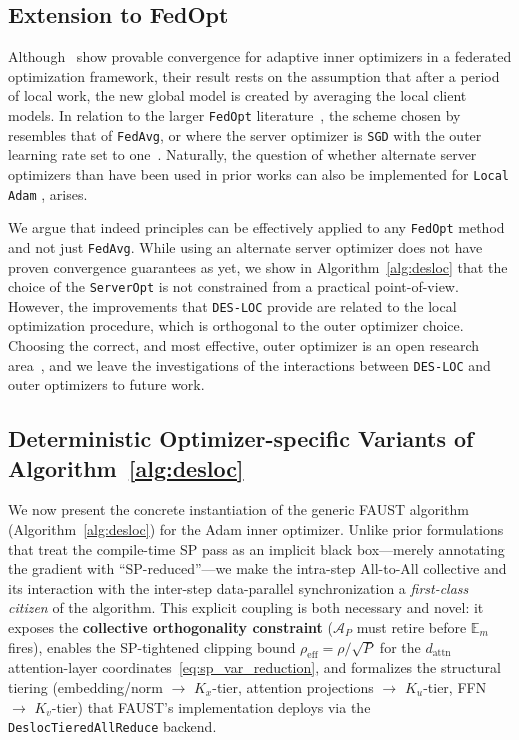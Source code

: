 \documentclass{article}
\begin{document}
\subsection{Extension to FedOpt}
\label{sec:fedopt2}

Although~\citet{cheng2025convergencedistributedadaptiveoptimization} show provable convergence for adaptive inner optimizers in a
federated optimization framework, their result rests on the assumption that after a period of local
work, the new global model is created by averaging the local client models. In relation to the larger
\texttt{FedOpt} literature~\citep{reddi2021adaptivefederatedoptimization}, the scheme chosen by~\citet{cheng2025convergencedistributedadaptiveoptimization} resembles
that of \texttt{FedAvg}, or where the server optimizer is \texttt{SGD} with the outer learning rate set to one~\citep{reddi2021adaptivefederatedoptimization}.
Naturally, the question of whether alternate server optimizers than have been used in prior works
can also be implemented for \texttt{Local Adam} , arises.

We argue that indeed principles can be effectively applied to any \texttt{FedOpt} method and
not just \texttt{FedAvg}. While using an alternate server optimizer does not have proven convergence
guarantees as yet, we show in Algorithm~\ref{alg:desloc} that the choice of the \texttt{ServerOpt} is not constrained
from a practical point-of-view. However, the improvements that \texttt{DES-LOC} provide are related to
the local optimization procedure, which is orthogonal to the outer optimizer choice.
Choosing the correct, and most effective, outer optimizer is an open research area~\citep{khaled2025understandingouteroptimizerslocal},
and we leave the investigations of the interactions between \texttt{DES-LOC} and outer optimizers to future work.


\subsection{Deterministic Optimizer-specific Variants of Algorithm~\ref{alg:desloc}}
\label{sec:algorithm_variants}

We now present the concrete instantiation of the generic FAUST algorithm
(Algorithm~\ref{alg:desloc}) for the Adam inner optimizer.
Unlike prior formulations that treat the compile-time SP pass as an implicit
black box---merely annotating the gradient with ``SP-reduced''---we make the
intra-step All-to-All collective and its interaction with the inter-step
data-parallel synchronization a \emph{first-class citizen} of the algorithm.
This explicit coupling is both necessary and novel:
it exposes the \textbf{collective orthogonality constraint}
($\mathcal{A}_P$ must retire before $\mathbb{E}_m$ fires),
enables the SP-tightened clipping bound $\rho_{\text{eff}} = \rho / \sqrt{P}$
for the $d_{\text{attn}}$ attention-layer coordinates~\eqref{eq:sp_var_reduction},
and formalizes the structural tiering (embedding/norm $\to$ $K_x$-tier,
attention projections $\to$ $K_u$-tier, FFN $\to$ $K_v$-tier) that FAUST's
implementation deploys via the \texttt{DeslocTieredAllReduce} backend.
\end{document}
